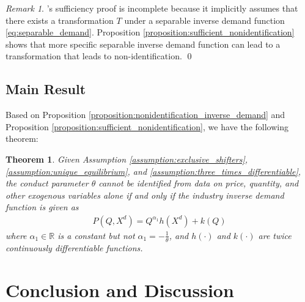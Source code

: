 \documentclass[11pt, a4paper]{article}
\newtheorem{theorem}{Theorem}
\theoremstyle{remark}
\newtheorem{remark}{Remark}
\newcommand{\appendixsection}{%
  \setcounter{section}{0}%
  \renewcommand{\thesection}{\Alph{section}}%
  \renewcommand{\thetheorem}{\Alph{section}.\arabic{theorem}}%
  \renewcommand{\thelemma}{\Alph{section}.\arabic{lemma}}%
  \renewcommand{\theproposition}{\Alph{section}.\arabic{proposition}}%
  \renewcommand{\thecorollary}{\Alph{section}.\arabic{corollary}}%
  \renewcommand{\thedefinition}{\Alph{section}.\arabic{definition}}%
}
\begin{document}
\begin{remark}
    \citet{lau1982identifying}'s sufficiency proof is incomplete because it implicitly assumes that there exists a transformation $T$ under a separable inverse demand function \eqref{eq:separable_demand}.
    Proposition \ref{proposition:sufficient_nonidentification} shows that more specific separable inverse demand function can lead to a transformation that leads to non-identification. \qed
\end{remark}




\subsection{Main Result}

Based on Proposition \ref{proposition:nonidentification_inverse_demand} and Proposition \ref{proposition:sufficient_nonidentification}, we have the following theorem:
\begin{theorem}\label{theorem:identification_characterization}
    Given Assumption \ref{assumption:exclusive_shifters}, \ref{assumption:unique_equilibrium}, and \ref{assumption:three_times_differentiable}, the conduct parameter $\theta$ cannot be identified from data on price, quantity, and other exogenous variables alone if and only if the industry inverse demand function is given as
    \begin{align}
        P(Q, X^{d}) = Q^{\alpha_1}h(X^{d}) + k(Q)
    \end{align}
    where $\alpha_1 \in \mathbb{R}$ is a constant but not $\alpha_1 = -\frac{1}{\theta}$, and $h(\cdot)$ and $k(\cdot)$ are twice continuously differentiable functions.
\end{theorem}











\section{Conclusion and Discussion}






\newpage
\appendix
\appendixsection
{}
\end{document}
